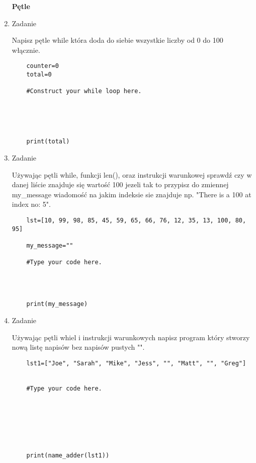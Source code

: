\documentclass[11pt]{article}
\begin{document}
\begin{enumerate}
\medskip
\begin{Large}
	\textbf{Pętle}
\end{Large}

\item 
\begin{Large}
	Zadanie
\end{Large}
\par
Napisz pętle while która doda do siebie wszystkie liczby od 0 do 100 włącznie.
\begin{lstlisting}
	counter=0
	total=0
	
	#Construct your while loop here.
	
	
	
	
	
	print(total)
\end{lstlisting}

\item\begin{Large}
	Zadanie
\end{Large}
\par
Używając pętli while, funkcji len(), oraz instrukcji warunkowej sprawdź czy w danej liście znajduje się wartość 100 jezeli tak to przypisz do zmiennej my\_message wiadomość na jakim indeksie sie znajduje np. "There is a 100 at index no: 5".
\begin{lstlisting}
	lst=[10, 99, 98, 85, 45, 59, 65, 66, 76, 12, 35, 13, 100, 80, 95]
	
	my_message=""
	
	#Type your code here.
	
	
	
	
	print(my_message)
\end{lstlisting}

\item 
\begin{Large}
	Zadanie
\end{Large}
\par
Używając pętli whiel i instrukcji warunkowych napisz program który stworzy nową listę napisów bez napisów pustych "".
\begin{lstlisting}
	lst1=["Joe", "Sarah", "Mike", "Jess", "", "Matt", "", "Greg"]
	
	
	#Type your code here.
	
	
	
	
	
	
	
	print(name_adder(lst1))
	
\end{lstlisting}


\end{enumerate}
\end{document}

